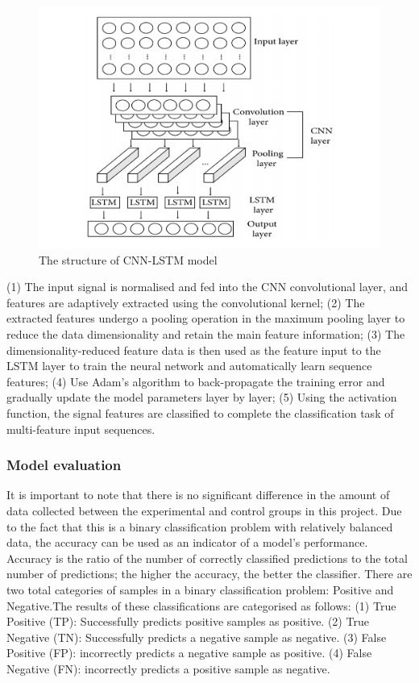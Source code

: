 \documentclass[11pt,a4paper]{article}
\begin{document}
\begin{spacing}{1.5}
\begin{figure}[ht]
	\centering
	\includegraphics[scale=0.4]{CNN-LSTM}
	\caption{The structure of CNN-LSTM model \citet{inproceedings}}
	\label{CNN-LSTM}
\end{figure}

(1) The input signal is normalised and fed into the CNN convolutional layer, and features are adaptively extracted using the convolutional kernel;
(2) The extracted features undergo a pooling operation in the maximum pooling layer to reduce the data dimensionality and retain the main feature information;
(3) The dimensionality-reduced feature data is then used as the feature input to the LSTM layer to train the neural network and automatically learn sequence features;
(4) Use Adam's algorithm to back-propagate the training error and gradually update the model parameters layer by layer;
(5) Using the activation function, the signal features are classified to complete the classification task of multi-feature input sequences.

\subsubsection{Model evaluation}
It is important to note that there is no significant difference in the amount of data collected between the experimental and control groups in this project. Due to the fact that this is a binary classification problem with relatively balanced data, the accuracy can be used as an indicator of a model's performance.
Accuracy is the ratio of the number of correctly classified predictions to the total number of predictions; the higher the accuracy, the better the classifier.
There are two total categories of samples in a binary classification problem: Positive and Negative.The results of these classifications are categorised as follows:
(1) True Positive (TP): Successfully predicts positive samples as positive.
(2) True Negative (TN): Successfully predicts a negative sample as negative.
(3) False Positive (FP): incorrectly predicts a negative sample as positive.
(4) False Negative (FN): incorrectly predicts a positive sample as negative.


\end{spacing}
\end{document}
